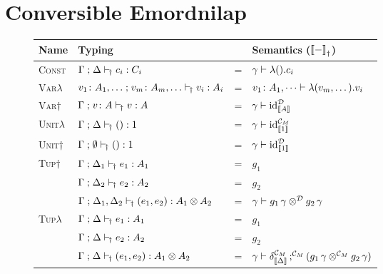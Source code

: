 \documentclass[runningheads,envcountsame]{llncs}
\newcommand{\monad}{M}
\begin{document}
\section{Conversible Emordnilap}
 
\iffalse
\begin{figure}
    \centering
    {\def\arraystretch{1.5}
    \begin{tabular}{l|l c l}
          Name & Typing & & Semantics ($\semD{-}$) \\
          \hline\hline
          \textsc{Const}
        & $\typeruled{\Gamma}{\Delta}{c_i}{\C_\monad}{C_i}$
        & = & $\gamma \vdash \elam{\eunit}{c_i}$ 
        \\ \hline
          \textsc{Var}$\lambda$
        & $\typeruled{v_1\colon A_1, \dots}{v_m\colon A_m, \dots}{v_i}{\C_\monad}{A_i}$
        & = & $v_1\colon A_1, \dots \vdash \elam{(v_m, \dots)}{v_i}$ 
        \\ \hline
          \textsc{Var}$\dagger$
        & $\typeruled{\Gamma}{v\colon A}{v}{\D}{A}$
        & = & $\gamma \vdash \id[\D]_{\sem{A}}$
        \\ \hline
          \textsc{Unit}$\lambda$
        & $\typeruled{\Gamma}{\Delta}{\eunit}{\C_\monad}{\tunit}$
        & = & $\gamma \vdash \id[\C_\monad]_{\sem{\tunit}}$ 
        \\ \hline
          \textsc{Unit}$\dagger$
        & $\typeruled{\Gamma}{\emptyset}{\eunit}{\D}{\tunit}$
        & = & $\gamma \vdash \id[\D]_{\sem{\tunit}}$ 
        \\ \hline
          \multirow{3}{*}{\textsc{Tup}$\dagger$}
        & $\typeruled{\Gamma}{\Delta_1}{e_1}{\D}{A_1}$ 
        & = & $g_1$ \\ 
        & $\typeruled{\Gamma}{\Delta_2}{e_2}{\D}{A_2}$
        & = & $g_2$ \\ \cline{2-2}
        & $\typeruled{\Gamma}{\Delta_1, \Delta_2}{\epair{e_1}{e_2}}{\D}{\tensor{A_1}{A_2}}$
        & = & $\gamma \vdash \tensor[\D]{\eapp{g_1}{\gamma}}{\eapp{g_2}{\gamma}}$
        \\ \hline
          \multirow{3}{*}{\textsc{Tup}$\lambda$}
        & $\typeruled{\Gamma}{\Delta}{e_1}{\C_\monad}{A_1}$ 
        & = & $g_1$ \\ 
        & $\typeruled{\Gamma}{\Delta}{e_2}{\C_\monad}{A_2}$
        & = & $g_2$ \\ \cline{2-2}
        & $\typeruled{\Gamma}{\Delta}{\epair{e_1}{e_2}}{\C_\monad}{\tensor{A_1}{A_2}}$
        & = & $\gamma \vdash \comp[\C_\monad]{\dup[\C_\monad]_{\sem{\Delta}}}{(\tensor[\C_\monad]{\eapp{g_1}{\gamma}}{\eapp{g_2}{\gamma}})}$

\end{tabular}}
\end{figure}
\end{document}
